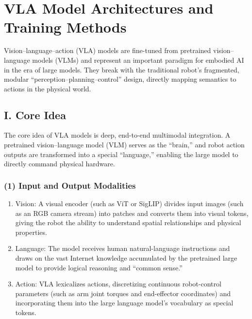 \setcounter{section}{0}

\hypertarget{vla-model-architectures-and-training-methods}{%
\section{VLA Model Architectures and Training Methods}\label{vla-model-architectures-and-training-methods}}

Vision--language--action (VLA) models are fine-tuned from pretrained vision--language models (VLMs) and represent an important paradigm for embodied AI in the era of large models. They break with the traditional robot's fragmented, modular ``perception--planning--control'' design, directly mapping semantics to actions in the physical world.

\hypertarget{i.-core-idea-8}{%
\subsection{I. Core Idea}\label{i.-core-idea-8}}

The core idea of VLA models is deep, end-to-end multimodal integration. A pretrained vision--language model (VLM) serves as the ``brain,'' and robot action outputs are transformed into a special ``language,'' enabling the large model to directly command physical hardware.

\hypertarget{input-and-output-modalities}{%
\subsubsection{(1) Input and Output Modalities}\label{input-and-output-modalities}}

\begin{enumerate}
\def\labelenumi{\arabic{enumi}.}
\item
  Vision: A visual encoder (such as ViT or SigLIP) divides input images (such as an RGB camera stream) into patches and converts them into visual tokens, giving the robot the ability to understand spatial relationships and physical properties.
\item
  Language: The model receives human natural-language instructions and draws on the vast Internet knowledge accumulated by the pretrained large model to provide logical reasoning and ``common sense.''
\item
  Action: VLA lexicalizes actions, discretizing continuous robot-control parameters (such as arm joint torques and end-effector coordinates) and incorporating them into the large language model's vocabulary as special tokens.
\end{enumerate}

